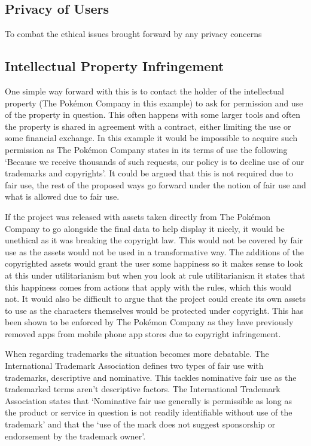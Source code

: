 \documentclass[a4paper]{article}
\newcommand{\Pokemon}{Pok\'{e}mon}
\begin{document}
\subsection{Privacy of Users}
To combat the ethical issues brought forward by any privacy concerns

\subsection{Intellectual Property Infringement}
One simple way forward with this is to contact the holder of the intellectual property (The \Pokemon{} Company in this example) to ask for permission and use of the property in question.
This often happens with some larger tools and often the property is shared in agreement with a contract, either limiting the use or some financial exchange.
In this example it would be impossible to acquire such permission as The \Pokemon{} Company states in its terms of use the following `Because we receive thousands of such requests, our policy is to decline use of our trademarks and copyrights'\cite{pokemonTOS}.
It could be argued that this is not required due to fair use, the rest of the proposed ways go forward under the notion of fair use and what is allowed due to fair use.
\\ \par
If the project was released with assets taken directly from The \Pokemon{} Company to go alongside the final data to help display it nicely, it would be unethical as it was breaking the copyright law.
This would not be covered by fair use as the assets would not be used in a transformative way.
The additions of the copyrighted assets would grant the user some happiness so it makes sense to look at this under utilitarianism but when you look at rule utilitarianism it states that this happiness comes from actions that apply with the rules, which this would not.
It would also be difficult to argue that the project could create its own assets to use as the characters themselves would be protected under copyright.
This has been shown to be enforced by The \Pokemon{} Company as they have previously removed apps from mobile phone app stores due to copyright infringement\cite{pokedexCopyright}.
\par
When regarding trademarks the situation becomes more debatable.
The International Trademark Association defines two types of fair use with trademarks, descriptive and nominative.
This tackles nominative fair use as the trademarked terms aren't descriptive factors.
The International Trademark Association states that `Nominative fair use generally is permissible as long as the product or service in question is not readily identifiable without use of the trademark' and that the `use of the mark does not suggest sponsorship or endorsement by the trademark owner'\cite{ITA}.
\end{document}
